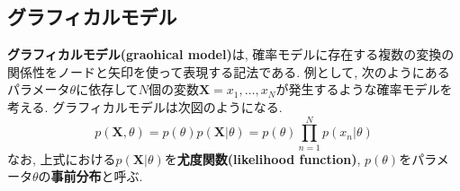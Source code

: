 \documentclass[twocolumn]{jarticle}
\begin{document}
\subsection{グラフィカルモデル}
{\bf グラフィカルモデル(graohical model)}は, 確率モデルに存在する複数の変換の関係性をノードと矢印を使って表現する記法である. 例として, 次のようにあるパラメータ${\theta }$に依存して${N}$個の変数${\bm {X} = {x_1, \ldots, x_N}}$が発生するような確率モデルを考える. グラフィカルモデルは次図のようになる.
\begin{equation}
  p(\bm {X}, \theta) = p(\theta)p(\bm {X}|\theta) = p(\theta)\prod_{n=1}^N p(x_n|\theta)
\end{equation}
なお, 上式における${p(\bm {X}|\theta)}$を{\bf 尤度関数(likelihood function)}, ${p(\theta)}$をパラメータ${\theta}$の{\bf 事前分布}と呼ぶ.
\end{document}
